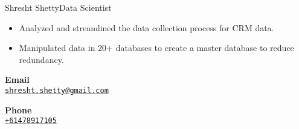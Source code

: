\documentclass{article}
\begin{document}
\begin{cv}{Shresht Shetty}{Data Scientist}
\begin{cvevent}[March 2019][June 2019]
\begin{itemize}
        \item Analyzed and streamlined the data collection process for CRM data.

        \item Manipulated data in 20+ databases to create a master database to reduce redundancy.

    \end{itemize}

\end{cvevent}






\begin{cvevent}[2018][2020]



\end{cvevent}



\cvseparator[2]

\begin{cvevent}[2014][2018]



\end{cvevent}



\cvsidebar 




\begin{cvitem}[Envelope][4]

    \textbf{Email}\\

    \href{mailto:shresht.shetty@gmail.com}{\texttt{shresht.shetty@gmail.com}}

\end{cvitem}



\cvseparator[3]

\begin{cvitem}[Phone][4]

    \textbf{Phone}\\

    \href{tel:+61478917105}{\texttt{+61478917105}}

\end{cvitem}




\end{cv}
\end{document}
